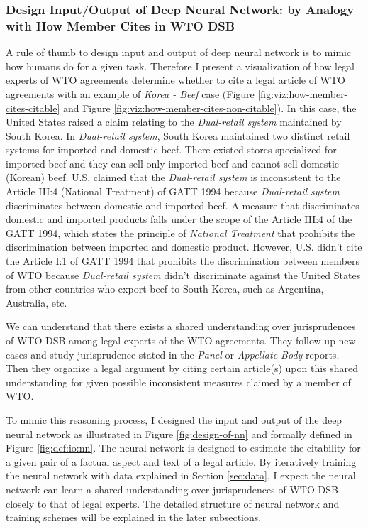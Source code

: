 \documentclass[12pt,letterpaper]{article}
\begin{document}
\subsubsection{Design Input/Output of Deep Neural Network: by Analogy with How Member Cites in WTO DSB} \label{design:io}
A rule of thumb to design input and output of deep neural network is to mimic
how humans do for a given task.
Therefore I present a visualization of how legal experts of WTO agreements determine whether to cite a legal article of WTO agreements with an example of \textit{Korea - Beef} case (Figure \ref{fig:viz:how-member-cites-citable} and Figure \ref{fig:viz:how-member-cites-non-citable}).
In this case, the United States raised a claim relating to the \textit{Dual-retail system} maintained by South Korea. In \textit{Dual-retail system}, South Korea maintained two distinct retail systems
for imported and domestic beef. There existed stores specialized for imported beef and they can sell only imported beef and cannot sell domestic (Korean) beef. U.S. claimed that the \textit{Dual-retail system} is inconsistent to the Article III:4 (National Treatment) of GATT 1994
because \textit{Dual-retail system} discriminates between domestic and imported beef. A measure that discriminates domestic and imported products falls under the scope of the Article III:4 of the GATT 1994, which states the principle of \textit{National Treatment} that prohibits the discrimination between imported and domestic product. However, U.S. didn't
cite the Article I:1 of GATT 1994 that prohibits the discrimination between members of WTO
because \textit{Dual-retail system} didn't discriminate against the United States from other countries who export beef to South Korea, such as Argentina, Australia, etc.
 
We can understand that there exists a shared understanding over jurisprudences of WTO DSB among legal experts of the WTO agreements. They follow up new cases and study jurisprudence stated in the \textit{Panel} or  \textit{Appellate Body} reports.
Then they organize a legal argument by citing certain article(s) upon this shared understanding for given possible inconsistent measures claimed by a member of WTO.
 
To mimic this reasoning process, I designed the input and output of the deep neural network as illustrated in Figure \ref{fig:design-of-nn} and formally defined in Figure \ref{fig:def:io:nn}.
The neural network is designed to estimate the citability for a given pair of a factual aspect and text of a legal article.
By iteratively training the neural network with data explained in Section \ref{sec:data}, I expect the neural network can learn a shared understanding over jurisprudences of WTO DSB closely to that of legal experts.
The detailed structure of neural network and training schemes will be explained in the later subsections.
\clearpage

\end{document}

